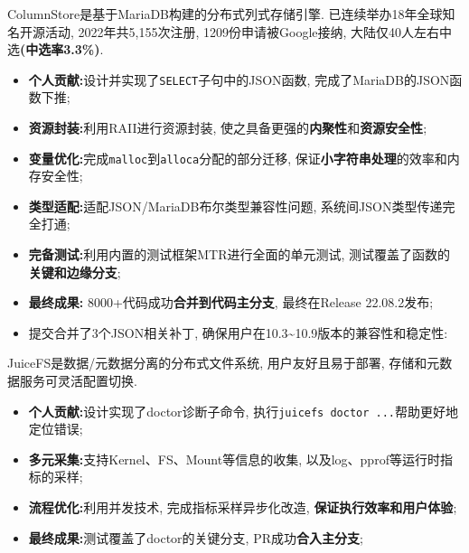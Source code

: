 \documentclass{resume}
\begin{document}
ColumnStore是基于MariaDB构建的分布式列式存储引擎. 已连续举办18年全球知名开源活动, 2022年共5,155次注册, 1209份申请被Google接纳, 大陆仅40人左右中选\textbf{(中选率3.3\%)}.
\begin{itemize}[parsep=0.2ex]
  \item \textbf{个人贡献:}设计并实现了\verb|SELECT|子句中的JSON函数, 完成了MariaDB的JSON函数下推;
  \item \textbf{资源封装:}利用RAII进行资源封装, 使之具备更强的\textbf{内聚性}和\textbf{资源安全性};
  \item \textbf{变量优化:}完成\verb|malloc|到\verb|alloca|分配的部分迁移, 保证\textbf{小字符串处理}的效率和内存安全性;
  \item \textbf{类型适配:}适配JSON/MariaDB布尔类型兼容性问题, 系统间JSON类型传递完全打通;
  \item \textbf{完备测试:}利用内置的测试框架MTR进行全面的单元测试, 测试覆盖了函数的\textbf{关键和边缘分支};
  \item \textbf{最终成果:} 8000+代码成功\textbf{合并到代码主分支}, 最终在Release 22.08.2发布;\enspace{}
  \item 提交合并了3个JSON相关补丁, 确保用户在10.3\textasciitilde 10.9版本的兼容性和稳定性:\enspace{}
\end{itemize}

JuiceFS是数据/元数据分离的分布式文件系统, 用户友好且易于部署, 存储和元数据服务可灵活配置切换.
\begin{itemize}[parsep=0.2ex]
  \item \textbf{个人贡献:}设计实现了doctor诊断子命令, 执行\verb|juicefs doctor ...|帮助更好地定位错误;
  \item \textbf{多元采集:}支持Kernel、FS、Mount等信息的收集, 以及log、pprof等运行时指标的采样;
  \item \textbf{流程优化:}利用并发技术, 完成指标采样异步化改造, \textbf{保证执行效率和用户体验};
  \item \textbf{最终成果:}测试覆盖了doctor的关键分支, PR成功\textbf{合入主分支};\enspace{}
\end{itemize}
\end{document}
